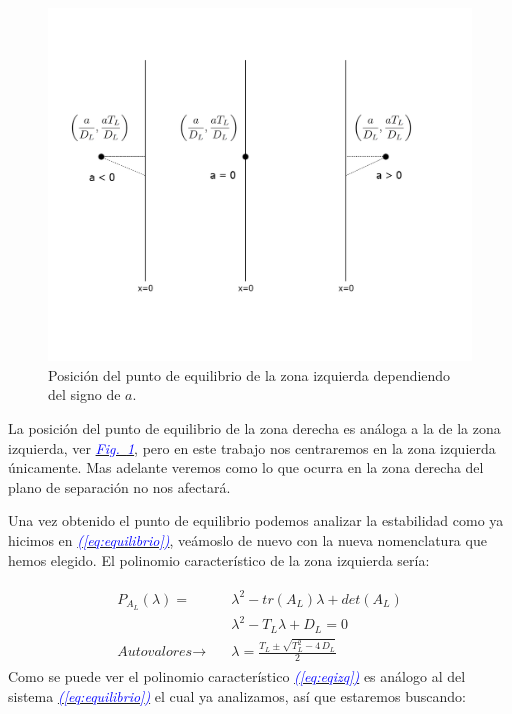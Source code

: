 \documentclass[12pt,a4paper]{report} %
\newcommand{\fref}[1]{\hyperref[#1]{\textcolor{blue}{\textit{Fig.~\ref*{#1}}}}}
\newcommand{\eref}[1]{\hyperref[#1]{\textcolor{blue}{\textit{(\ref*{#1})}}}}
\begin{document}
		\begin{figure}[h]
			\centering
			\includegraphics[width=1\textwidth]{punto.jpg}
			\caption{Posición del punto de equilibrio de la zona izquierda dependiendo del signo de $a$.}
			\label{fig:punto}
		\end{figure}\smallskip
		
		La posición del punto de equilibrio de la zona derecha es análoga a la de la zona izquierda, ver \fref{fig:punto}, pero en este trabajo nos centraremos en la zona izquierda únicamente. Mas adelante veremos como lo que ocurra en la zona derecha del plano de separación no nos afectará.
		
		\vspace{0.5cm} Una vez obtenido el punto de equilibrio podemos analizar la estabilidad como ya hicimos en \eref{eq:equilibrio}, veámoslo de nuevo con la nueva nomenclatura que hemos elegido. El polinomio característico de la zona izquierda sería:
		
		\begin{eqnarray}
			\label{eq:eqizq}
			\begin{aligned}
				P_{A_L}(\lambda)=&\lambda^2-tr(A_L)\lambda+det(A_L) \\[1mm]
				&\lambda^2-T_L\lambda+D_L=0 \\[2mm]
				\textit{Autovalores}\rightarrow \quad &\lambda=\frac{T_L\pm \sqrt{T_L^2-4\,D_L}}{2}
			\end{aligned}
		\end{eqnarray}\smallskip
		\newpage
		Como se puede ver el polinomio característico \eref{eq:eqizq} es análogo al del sistema \eref{eq:equilibrio} el cual ya analizamos, así que estaremos buscando:
		
\end{document}
